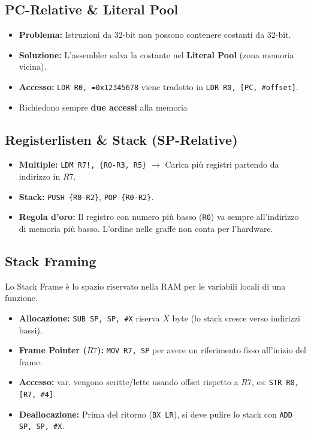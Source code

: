 \subsection{PC-Relative \& Literal Pool}
\begin{itemize}
    \item \textbf{Problema:} Istruzioni da 32-bit non possono contenere costanti da 32-bit.
    \item \textbf{Soluzione:} L'assembler salva la costante nel \textbf{Literal Pool} (zona memoria vicina).
    \item \textbf{Accesso:} \texttt{LDR R0, =0x12345678} viene tradotto in \texttt{LDR R0, [PC, \#offset]}.
    \item Richiedono sempre \textbf{due accessi} alla memoria
\end{itemize}

\subsection{Registerlisten \& Stack (SP-Relative)}
\begin{itemize}
    \item \textbf{Multiple:} \texttt{LDM R7!, \{R0-R3, R5\}} $\rightarrow$ Carica più registri partendo da indirizzo in $R7$.
    \item \textbf{Stack:} \texttt{PUSH \{R0-R2\}}, \texttt{POP \{R0-R2\}}.
    \item \textbf{Regola d'oro:} Il registro con numero più basso (\texttt{R0}) va sempre all'indirizzo di memoria più basso. L'ordine nelle graffe non conta per l'hardware.
\end{itemize}

\subsection{Stack Framing}
Lo Stack Frame è lo spazio riservato nella RAM per le variabili locali di una funzione.

\begin{itemize}
    \item \textbf{Allocazione:} \texttt{SUB SP, SP, \#X} riserva $X$ byte (lo stack cresce verso indirizzi bassi).
    \item \textbf{Frame Pointer ($R7$):} \texttt{MOV R7, SP} per avere un riferimento fisso all'inizio del frame.
    \item \textbf{Accesso:} var. vengono scritte/lette usando offset rispetto a $R7$, es: \texttt{STR R0, [R7, \#4]}.
    \item \textbf{Deallocazione:} Prima del ritorno (\texttt{BX LR}), si deve pulire lo stack con \texttt{ADD SP, SP, \#X}.
\end{itemize}